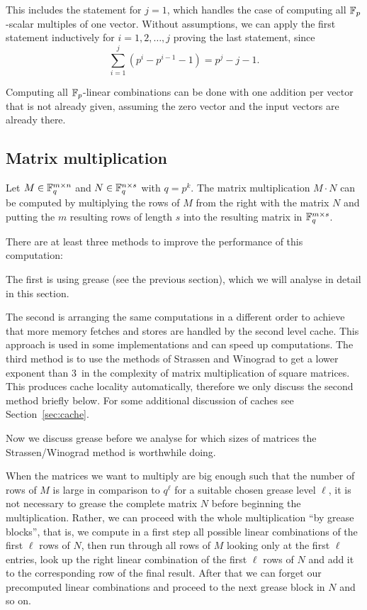 This includes the statement for $j=1$, which handles the case of computing
all $\mathbb{F}_p$-scalar multiples of one vector. Without assumptions, we can
apply the first statement inductively for $i=1, 2, \ldots, j$ proving
the last statement, since
\[ \sum_{i=1}^j (p^i - p^{i-1} - 1) = p^j - j - 1. \]
\ProofEnd

\begin{Rem}
Computing all $\mathbb{F}_p$-linear combinations can be done
with one addition per vector that is not already given, assuming
the zero vector and the input vectors are already there.
\end{Rem}

\subsection{Matrix multiplication}

Let $M \in \mathbb{F}_q^{m \times n}$ and $N \in \mathbb{F}_q^{n \times s}$ with $q = p^k$.
The matrix multiplication $M \cdot N$ can be computed by multiplying the
rows of $M$ from the right with the matrix $N$ and putting the $m$ resulting
rows of length $s$ into the resulting matrix in $\mathbb{F}_q^{m \times s}$.

There are at least three methods to improve the performance of this
computation: 

The first is using grease (see the previous section), which
we will analyse in detail in this section. 

The second is arranging the same computations in a different order to 
achieve that more memory fetches and stores are handled by the second
level cache. This approach is used in some implementations and can
speed up computations. 
The third method is to use the methods of Strassen and Winograd to
%
get a lower exponent than $3$~in the complexity of matrix multiplication
of square matrices.
This produces cache locality
automatically, therefore we only discuss the second method briefly below.
For some additional discussion of caches see Section~\ref{sec:cache}. 

Now we discuss grease before we analyse for which sizes of
matrices the Strassen/Winograd method is worthwhile doing.

When the matrices we want to multiply are big enough such that the number
of rows of $M$ is large in comparison to $q^\ell$
for a suitable chosen grease level $\ell$, it is not necessary to grease
the complete matrix $N$ before beginning the multiplication. Rather,
we can proceed with the whole multiplication ``by grease blocks'', that
is, we compute in a first step all possible linear combinations of the
first $\ell$ rows of $N$, then run through all rows of $M$ looking
only at the first $\ell$ entries, look up the right
linear combination of the first $\ell$ rows of $N$ and add it 
to the corresponding
row of the final result. After that we can forget our precomputed linear
combinations and proceed to the next grease block in $N$ and so on.

